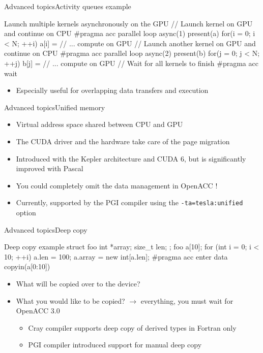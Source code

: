 \documentclass[12pt,aspectratio=169]{beamer}
\newcommand\shinline[2][]{\lstinline[style=shstyle,basicstyle=\ttfamily,#1]!#2!}
\begin{document}
\begin{frame}[fragile]{Advanced topics}{Activity queues example}
  \begin{Cpplisting}{Launch multiple kernels asynchronously on the GPU}
// Launch kernel on GPU and continue on CPU
#pragma acc parallel loop async(1) present(a)
for(i = 0; i < N; ++i) {
  a[i] = // ... compute on GPU
}
// Launch another kernel on GPU and continue on CPU
#pragma acc parallel loop async(2) present(b)
for(j = 0; j < N; ++j) {
  b[j] = // ... compute on GPU
}
// Wait for all kernels to finish
#pragma acc wait
  \end{Cpplisting}
  \begin{itemize}
  \item Especially useful for overlapping data transfers and execution
  \end{itemize}
\end{frame}

\begin{frame}[fragile]{Advanced topics}{Unified memory}
  \begin{itemize}
  \item Virtual address space shared between CPU and GPU
  \item The CUDA driver and the hardware take care of the page migration
  \item Introduced with the Kepler architecture and CUDA 6, but is significantly improved with Pascal
    \pause\vfill
  \item You could completely omit the data management in OpenACC !
  \item Currently, supported by the PGI compiler using the \shinline{-ta=tesla:unified} option
  \end{itemize}
\end{frame}

\begin{frame}[fragile]{Advanced topics}{Deep copy}
  \vspace{.5em}
  \begin{Cpplisting}{Deep copy example}
struct foo {
    int *array;
    size_t len;
};
foo a[10];
for (int i = 0; i < 10; ++i) {
    a.len = 100;
    a.array = new int[a.len];
}
#pragma acc enter data copyin(a[0:10])
  \end{Cpplisting}
  \begin{itemize}
  \item What will be copied over to the device? 
  \item<3-> What you would like to be copied? $\rightarrow$
    everything, you must wait for OpenACC 3.0
    \begin{itemize}
    \item<3->Cray compiler supports deep copy of derived types in Fortran only
    \item<3->PGI compiler introduced support for manual deep copy
    \end{itemize}
  \end{itemize}
\end{frame}
\end{document}
